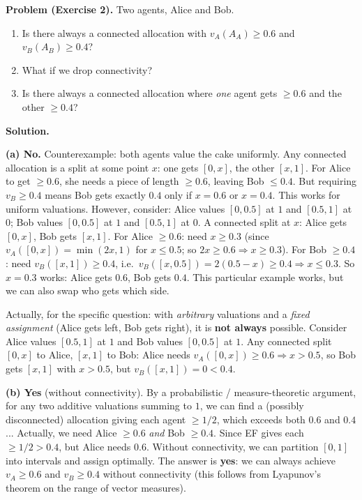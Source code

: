 \begin{exbox}
\textbf{Problem (Exercise 2).} Two agents, Alice and Bob.
\begin{enumerate}
  \item[(a)] Is there always a connected allocation with $v_A(A_A) \ge 0.6$ and $v_B(A_B) \ge 0.4$?
  \item[(b)] What if we drop connectivity?
  \item[(c)] Is there always a connected allocation where \emph{one} agent gets $\ge 0.6$ and the other $\ge 0.4$?
\end{enumerate}

\textbf{Solution.}

\textbf{(a) No.} Counterexample: both agents value the cake uniformly. Any connected allocation is a split at some point $x$: one gets $[0,x]$, the other $[x,1]$. For Alice to get $\ge 0.6$, she needs a piece of length $\ge 0.6$, leaving Bob $\le 0.4$. But requiring $v_B \ge 0.4$ means Bob gets exactly $0.4$ only if $x = 0.6$ or $x = 0.4$. This works for uniform valuations. However, consider: Alice values $[0, 0.5]$ at $1$ and $[0.5, 1]$ at $0$; Bob values $[0, 0.5]$ at $1$ and $[0.5, 1]$ at $0$. A connected split at $x$: Alice gets $[0, x]$, Bob gets $[x, 1]$. For Alice $\ge 0.6$: need $x \ge 0.3$ (since $v_A([0,x]) = \min(2x, 1)$ for $x \le 0.5$; so $2x \ge 0.6 \Rightarrow x \ge 0.3$). For Bob $\ge 0.4$: need $v_B([x,1]) \ge 0.4$, i.e.\ $v_B([x, 0.5]) = 2(0.5 - x) \ge 0.4 \Rightarrow x \le 0.3$. So $x = 0.3$ works: Alice gets $0.6$, Bob gets $0.4$. This particular example works, but we can also swap who gets which side.

Actually, for the specific question: with \emph{arbitrary} valuations and a \emph{fixed assignment} (Alice gets left, Bob gets right), it is \textbf{not always} possible. Consider Alice values $[0.5, 1]$ at $1$ and Bob values $[0, 0.5]$ at $1$. Any connected split $[0, x]$ to Alice, $[x, 1]$ to Bob: Alice needs $v_A([0,x]) \ge 0.6 \Rightarrow x > 0.5$, so Bob gets $[x, 1]$ with $x > 0.5$, but $v_B([x,1]) = 0 < 0.4$.

\textbf{(b) Yes} (without connectivity). By a probabilistic / measure-theoretic argument, for any two additive valuations summing to $1$, we can find a (possibly disconnected) allocation giving each agent $\ge 1/2$, which exceeds both $0.6$ and $0.4$... Actually, we need Alice $\ge 0.6$ \emph{and} Bob $\ge 0.4$. Since EF gives each $\ge 1/2 > 0.4$, but Alice needs $0.6$. Without connectivity, we can partition $[0,1]$ into intervals and assign optimally. The answer is \textbf{yes}: we can always achieve $v_A \ge 0.6$ and $v_B \ge 0.4$ without connectivity (this follows from Lyapunov's theorem on the range of vector measures).


\end{exbox}
